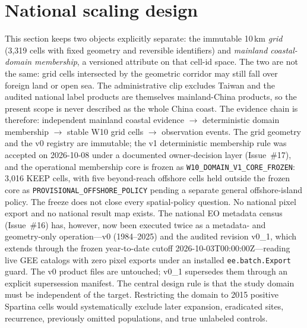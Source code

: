 \section{National scaling design}\label{sec:national}

This section keeps two objects explicitly separate: the immutable
10\,km \emph{grid} (3{,}319 cells with fixed geometry and reversible
identifiers) and \emph{mainland coastal-domain membership}, a
versioned attribute on that cell-id space. The two are not the same:
grid cells intersected by the geometric corridor may still fall over
foreign land or open sea. The administrative clip excludes Taiwan and
the audited national label products are themselves mainland-China
products, so the present scope is never described as the whole China
coast. The evidence chain is therefore: independent mainland coastal
evidence $\rightarrow$ deterministic domain membership $\rightarrow$
stable W10 grid cells $\rightarrow$ observation events. The grid geometry and the v0 registry are immutable; the v1 deterministic
membership rule was accepted on 2026-10-08 under a documented owner-decision
layer (Issue~\#17), and the operational membership core is frozen as
\texttt{W10\_DOMAIN\_V1\_CORE\_FROZEN}: 3{,}016 KEEP cells, with five
beyond-reach offshore cells held outside the frozen core as
\texttt{PROVISIONAL\_OFFSHORE\_POLICY} pending a separate general
offshore-island policy. The freeze does not close every spatial-policy
question. No national pixel export and no national result map exists. The national EO
metadata census (Issue~\#16) has, however, now been executed twice as a
metadata- and geometry-only operation---v0 (1984--2025) and the audited
revision v0\_1, which extends through the frozen year-to-date cutoff
2026-10-03T00:00:00Z---reading live GEE catalogs with zero pixel
exports under an installed \texttt{ee.batch.Export} guard. The v0
product files are untouched; v0\_1 supersedes them through an explicit
supersession manifest.
The central design rule is that the study domain must be independent of
the target. Restricting the domain to 2015 positive Spartina cells
would systematically exclude later expansion, eradicated sites,
recurrence, previously omitted populations, and true unlabeled controls.

